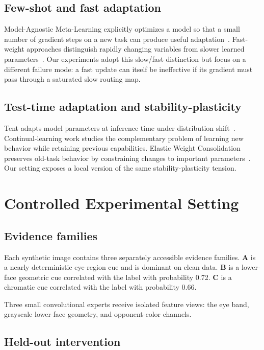 \documentclass[10pt]{article}
\begin{document}
\subsection{Few-shot and fast adaptation}

Model-Agnostic Meta-Learning explicitly optimizes a model so that a small number of gradient steps on a new task can produce useful adaptation~\cite{finn2017}. Fast-weight approaches distinguish rapidly changing variables from slower learned parameters~\cite{ba2016}. Our experiments adopt this slow/fast distinction but focus on a different failure mode: a fast update can itself be ineffective if its gradient must pass through a saturated slow routing map.

\subsection{Test-time adaptation and stability-plasticity}

Tent adapts model parameters at inference time under distribution shift~\cite{wang2021}. Continual-learning work studies the complementary problem of learning new behavior while retaining previous capabilities. Elastic Weight Consolidation preserves old-task behavior by constraining changes to important parameters~\cite{kirkpatrick2017}. Our setting exposes a local version of the same stability-plasticity tension.

\section{Controlled Experimental Setting}

\subsection{Evidence families}

Each synthetic image contains three separately accessible evidence families. \textbf{A} is a nearly deterministic eye-region cue and is dominant on clean data. \textbf{B} is a lower-face geometric cue correlated with the label with probability 0.72. \textbf{C} is a chromatic cue correlated with the label with probability 0.66.

Three small convolutional experts receive isolated feature views: the eye band, grayscale lower-face geometry, and opponent-color channels.

\subsection{Held-out intervention}
\end{document}
